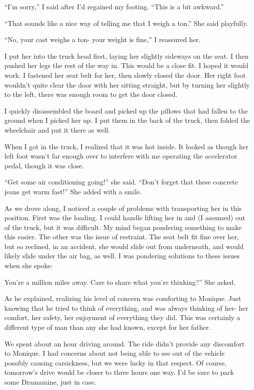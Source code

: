 ``I'm sorry,'' I said after I'd regained my footing. ``This is a bit awkward.''

``That sounds like a nice way of telling me that I weigh a ton.'' She said playfully.

``No, your cast weighs a ton- your weight is fine,'' I reassured her.

I put her into the truck head first, laying her slightly sideways on the seat. I then
pushed her legs the rest of the way in. This would be a close fit. I hoped it would work. I
fastened her seat belt for her, then slowly closed the door. Her right foot wouldn't quite clear
the door with her sitting straight, but by turning her slightly to the left, there was enough
room to get the door closed.

I quickly disassembled the board and picked up the pillows that had fallen to the ground
when I picked her up. I put them in the back of the truck, then folded the wheelchair and put it
there as well.

When I got in the truck, I realized that it was hot inside. It looked as though her left
foot wasn't far enough over to interfere with me operating the accelerator pedal, though it was
close.

``Get some air conditioning going!'' she said. ``Don't forget that these concrete jeans get
warm fast!'' She added with a smile.

As we drove along, I noticed a couple of problems with transporting her in this position.
First was the loading. I could handle lifting her in and (I assumed) out of the truck, but it
was difficult. My mind began pondering something to make this easier. The other was the issue of
restraint. The seat belt fit fine over her, but so reclined, in an accident, she would slide out
from underneath, and would likely slide under the air bag, as well. I was pondering solutions to
these issues when she spoke:

You're a million miles away. Care to share what you're thinking?'' She asked.

\begin{thought}
As he explained, realizing his level of concern was comforting to Monique. Just knowing
that he tried to think of everything, and was always thinking of her- her comfort, her safety,
her enjoyment of everything they did. This was certainly a different type of man than any she
had known, except for her father.
\end{thought}

We spent about an hour driving around. The ride didn't provide any discomfort to Monique. I
had concerns about not being able to see out of the vehicle possibly causing carsickness, but we
were lucky in that respect. Of course, tomorrow's drive would be closer to three hours one way.
I'd be sure to pack some Dramamine, just in case.

